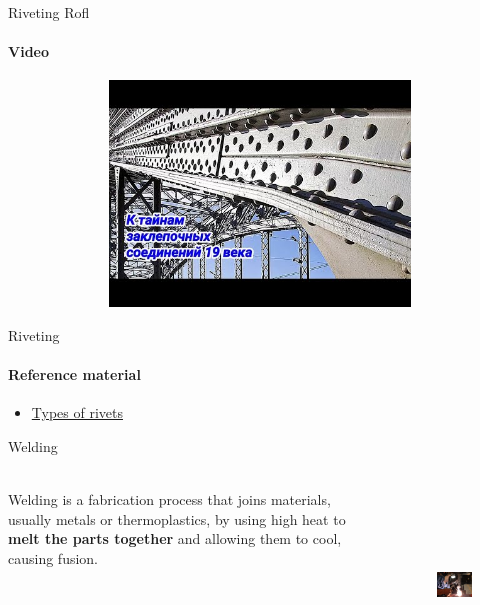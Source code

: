 \documentclass[aspectratio=169]{beamer}
\begin{document}
\begin{frame}[t]{Riveting Rofl}
    \framesubtitle{Video}
    \vspace{-0.6cm}
    \begin{figure}[H]
        \href{https://youtu.be/mGOiPPM6pKM}{
            \centering\includegraphics[height=6cm,width=1\textwidth,keepaspectratio]{riveting_rofl_video.jpg}}
        \label{fig:riveting_rofl_video.jpg}
    \end{figure}
\end{frame}

\begin{frame}[t]{Riveting}
    \framesubtitle{Reference material}
    \begin{itemize}
        \item \href{https://www.theengineerspost.com/types-of-rivets/}{Types of rivets}
    \end{itemize}
\end{frame}



\begin{frame}[t]{Welding}
    \framesubtitle{}
    \begin{columns}[T,onlytextwidth]
        \begin{column}{0.49\textwidth}
            Welding is a fabrication process that joins materials, usually metals or thermoplastics, by using high heat to \textbf{melt the parts together} and allowing them to cool, causing fusion.
        \end{column}
        \begin{column}{0.49\textwidth}
            \begin{figure}[H]
                \centering\includegraphics[height=5cm,width=1\textwidth,keepaspectratio]{welding.jpg}
                \label{fig:welding.jpg}
            \end{figure}
        \end{column}
    \end{columns}
\end{frame}
\end{document}
